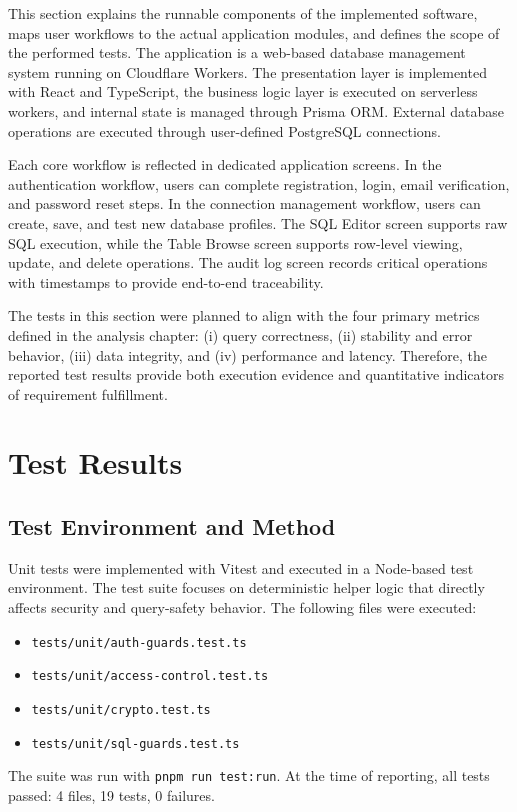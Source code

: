 This section explains the runnable components of the implemented software, maps user workflows to the actual application modules, and defines the scope of the performed tests. The application is a web-based database management system running on Cloudflare Workers. The presentation layer is implemented with React and TypeScript, the business logic layer is executed on serverless workers, and internal state is managed through Prisma ORM. External database operations are executed through user-defined PostgreSQL connections.

Each core workflow is reflected in dedicated application screens. In the authentication workflow, users can complete registration, login, email verification, and password reset steps. In the connection management workflow, users can create, save, and test new database profiles. The SQL Editor screen supports raw SQL execution, while the Table Browse screen supports row-level viewing, update, and delete operations. The audit log screen records critical operations with timestamps to provide end-to-end traceability.

The tests in this section were planned to align with the four primary metrics defined in the analysis chapter: (i) query correctness, (ii) stability and error behavior, (iii) data integrity, and (iv) performance and latency. Therefore, the reported test results provide both execution evidence and quantitative indicators of requirement fulfillment.


\section{Test Results}

\subsection{Test Environment and Method}

Unit tests were implemented with Vitest and executed in a Node-based test environment. The test suite focuses on deterministic helper logic that directly affects security and query-safety behavior. The following files were executed:
\begin{itemize}
    \item \texttt{tests/unit/auth-guards.test.ts}
    \item \texttt{tests/unit/access-control.test.ts}
    \item \texttt{tests/unit/crypto.test.ts}
    \item \texttt{tests/unit/sql-guards.test.ts}
\end{itemize}
The suite was run with \texttt{pnpm run test:run}. At the time of reporting, all tests passed: 4 files, 19 tests, 0 failures.

